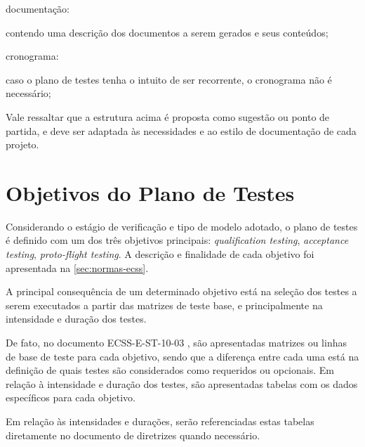 \begin{alineas}
    \item documentação:
    \begin{alineas}
        \item contendo uma descrição dos documentos a serem gerados e seus conteúdos;
    \end{alineas}

    \item cronograma:
    \begin{alineas}
        \item caso o plano de testes tenha o intuito de ser recorrente, o cronograma não é necessário;
    \end{alineas}

\end{alineas}

Vale ressaltar que a estrutura acima é proposta como sugestão ou ponto de partida, e deve ser adaptada às necessidades e ao estilo de documentação de cada projeto.


\section{Objetivos do Plano de Testes} \label{sec:objetivo-testes}


Considerando o estágio de verificação e tipo de modelo adotado, o plano de testes é definido com um dos três objetivos principais: \textit{qualification testing}, \textit{acceptance testing}, \textit{proto-flight testing}.
A descrição e finalidade de cada objetivo foi apresentada na \autoref{sec:normas-ecss}.

A principal consequência de um determinado objetivo está na seleção dos testes a serem executados a partir das matrizes de teste base, e principalmente na intensidade e duração dos testes.

De fato, no documento ECSS-E-ST-10-03 \cite{ecss-e-st-10-03}, são apresentadas matrizes ou linhas de base de teste para cada objetivo, sendo que a diferença entre cada uma está na definição de quais testes são considerados como requeridos ou opcionais.
Em relação à intensidade e duração dos testes, são apresentadas tabelas com os dados específicos para cada objetivo.

Em relação às intensidades e durações, serão referenciadas estas tabelas diretamente no documento de diretrizes quando necessário.






